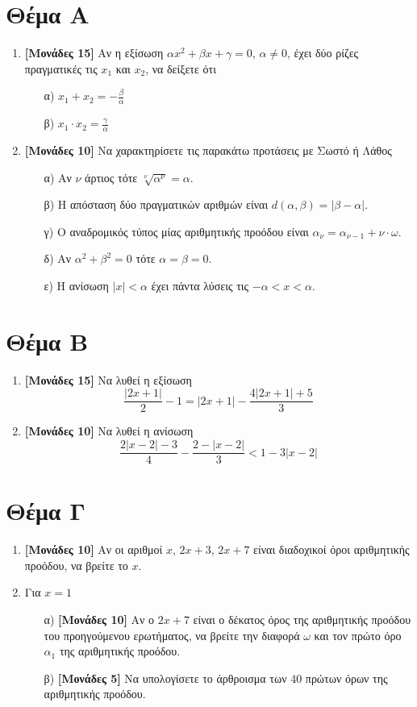 \documentclass[12pt]{article}
\begin{document}
\section*{Θέμα Α}
  \noindent
  \begin{enumerate}
    \item \textbf{[Μονάδες 15]} Αν η εξίσωση $αx^2+βx+γ=0$, $α\ne 0$, έχει δύο ρίζες πραγματικές τις $x_1$ και $x_2$, να δείξετε ότι
      \begin{enumerate}
        \item [α)] $x_1+x_2=-\frac{β}{α}$
        \item [β)] $x_1\cdot x_2=\frac{γ}{α}$
      \end{enumerate}
    \item \textbf{[Μονάδες 10]} Να χαρακτηρίσετε τις παρακάτω προτάσεις με Σωστό ή Λάθος
    \begin{enumerate}
      \item [α)] Αν $ν$ άρτιος τότε $\sqrt[ν]{α^ν}=α$.
      \item [β)] Η απόσταση δύο πραγματικών αριθμών είναι $d(α,β)=|β-α|$.
      \item [γ)] Ο αναδρομικός τύπος μίας αριθμητικής προόδου είναι $α_ν=α_{ν-1}+ν\cdot ω$.
      \item [δ)] Αν $α^2+β^2=0$ τότε $α=β=0$.
      \item [ε)] Η ανίσωση $|x|<α$ έχει πάντα λύσεις τις $-α<x<α$.
    \end{enumerate}
  \end{enumerate}

\section*{Θέμα Β}
  \noindent
    \begin{enumerate}
      \item \textbf{[Μονάδες 15]} Να λυθεί η εξίσωση $$\frac{| 2x+1|}{2}-1=| 2x+1|-\frac{4| 2x+1|+5}{3}$$
      \item \textbf{[Μονάδες 10]} Να λυθεί η ανίσωση $$\frac{2| x-2|-3}{4}-\frac{2-| x-2|}{3}<1-3| x-2|$$
    \end{enumerate}

\section*{Θέμα Γ}
  \noindent
  \begin{enumerate}
    \item \textbf{[Μονάδες 10]} Αν οι αριθμοί $x$, $2x+3$, $2x+7$ είναι διαδοχικοί όροι αριθμητικής προόδου, να βρείτε το $x$.
    \item Για $x=1$
    \begin{enumerate}
      \item[α)] \textbf{[Μονάδες 10]} Αν ο $2x+7$ είναι ο δέκατος όρος της αριθμητικής προόδου του προηγούμενου ερωτήματος, να βρείτε την διαφορά $ω$ και τον πρώτο όρο $α_1$ της αριθμητικής προόδου.
      \item[β)] \textbf{[Μονάδες 5]} Να υπολογίσετε το άρθροισμα των 40 πρώτων όρων της αριθμητικής προόδου.
    \end{enumerate}
  \end{enumerate}
\end{document}
